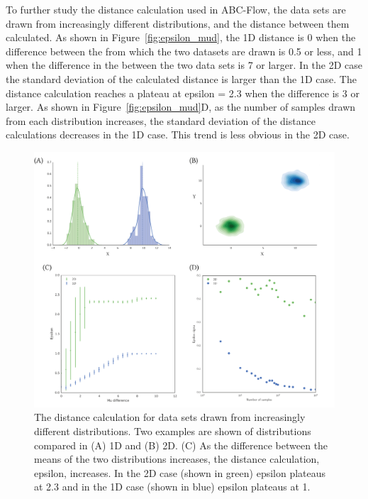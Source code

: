 To further study the distance calculation used in ABC-Flow, the data sets are drawn from increasingly different distributions, and the distance between them calculated. As shown in Figure~\ref{fig:epsilon_mud}, the 1D distance is 0 when the difference between the \textmu{} from which the two datasets are drawn is 0.5 or less, and 1 when the difference in the \textmu{} between the two data sets is 7 or larger. In the 2D case the standard deviation of the calculated distance is larger than the 1D case. The distance calculation reaches a plateau at epsilon = 2.3 when the \textmu{} difference is 3 or larger. As shown in Figure~\ref{fig:epsilon_mud}D, as the number of samples drawn from each distribution increases, the standard deviation of the distance calculations decreases in the 1D case. This trend is less obvious in the 2D case.
\begin{figure}[htbp]
\centering
\includegraphics[scale=0.7]{chapterABCFlow/images/mu_diff.png}
\caption[LoF caption]{\label{fig:epsilon_mud} The distance calculation for data sets drawn from increasingly different distributions. Two examples are shown of distributions compared in (A) 1D and (B) 2D. (C) As the difference between the means of the two distributions increases, the distance calculation, epsilon, increases. In the 2D case (shown in green) epsilon plateaus at 2.3 and in the 1D case (shown in blue) epsilon plateaus at 1.}
\label{fig:normal_example}
\end{figure}



